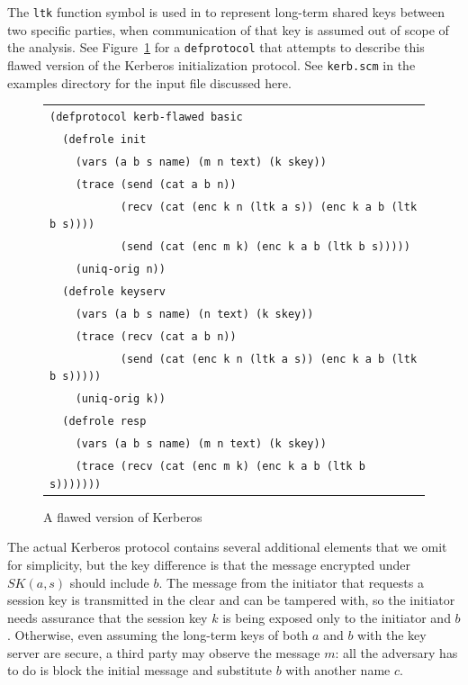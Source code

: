  The \texttt{ltk} function symbol is used in {\cpsa} to
represent long-term shared keys between two specific parties, when
communication of that key is assumed out of scope of the analysis.
See Figure~\ref{fig:kerb-flawed defprotocol} for a
\texttt{defprotocol} that attempts to describe this flawed version of
the Kerberos initialization protocol.  See \texttt{kerb.scm} in the
examples directory for the input file discussed here.

\begin{figure}
\centering
\begin{tabular}{l}
\verb|(defprotocol kerb-flawed basic|\\
\verb|  (defrole init|\\
\verb|    (vars (a b s name) (m n text) (k skey))|\\
\verb|    (trace (send (cat a b n))|\\
\verb|           (recv (cat (enc k n (ltk a s)) (enc k a b (ltk b s))))|\\
\verb|           (send (cat (enc m k) (enc k a b (ltk b s)))))|\\
\verb|    (uniq-orig n))|\\
\verb|  (defrole keyserv|\\
\verb|    (vars (a b s name) (n text) (k skey))|\\
\verb|    (trace (recv (cat a b n))|\\
\verb|           (send (cat (enc k n (ltk a s)) (enc k a b (ltk b s)))))|\\
\verb|    (uniq-orig k))|\\
\verb|  (defrole resp|\\
\verb|    (vars (a b s name) (m n text) (k skey))|\\
\verb|    (trace (recv (cat (enc m k) (enc k a b (ltk b s)))))))|\\
\end{tabular}
\caption{A flawed version of Kerberos}
\label{fig:kerb-flawed defprotocol}
\end{figure}

The actual Kerberos protocol contains several additional elements that
we omit for simplicity, but the key difference is that the message
encrypted under $SK(a,s)$ should include $b$.  The message from the
initiator that requests a session key is transmitted in the clear and
can be tampered with, so the initiator needs assurance that the
session key $k$ is being exposed only to the initiator and $b$.
Otherwise, even assuming the long-term keys of both $a$ and $b$ with
the key server are secure, a third party may observe the message $m$:
all the adversary has to do is block the initial message and substitute
$b$ with another name $c$.

